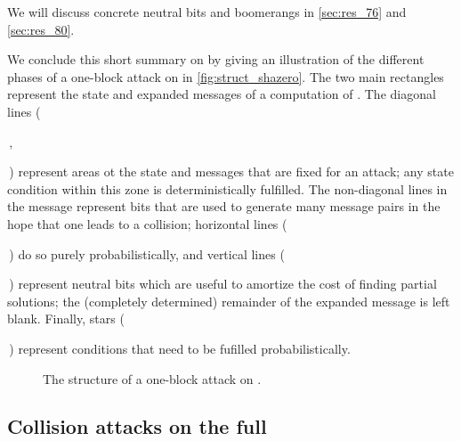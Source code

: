 \noindent
We will discuss concrete neutral bits and boomerangs in \autoref{sec:res_76} and \autoref{sec:res_80}.

We conclude this short summary on \shazero by giving an illustration of the different phases of a one-block attack on \shazero in \autoref{fig:struct_shazero}. The two main rectangles represent the state and
expanded messages of a computation of \shazero. The diagonal lines (\,\,,
\,) represent areas ot the state and messages that are fixed for an attack; any state condition within this zone is deterministically fulfilled.
The non-diagonal lines in the message represent bits that are used to generate many message pairs in the hope that one leads to a collision; horizontal lines
(\,\,) do so purely probabilistically, and vertical lines
(\,\,)
represent neutral bits which are useful to amortize the cost of finding partial solutions; the (completely determined) remainder of the expanded message is left blank.
Finally, stars
(\,\,)
represent conditions that need to be fufilled probabilistically.

\begin{figure}[!htb]
\begin{center}

\end{center}
\caption{The structure of a one-block attack on \shazero.\label{fig:struct_shazero}}
\end{figure}
 
\subsection{Collision attacks on the full \shaone}
\label{sec:full_sha1}

